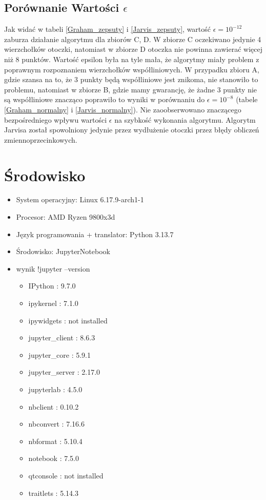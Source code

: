\documentclass[12pt, a4paper]{article}
\begin{document}
\subsection{Porównanie Wartości $\epsilon$} 
Jak widać w tabeli \ref{Graham_zepsuty} i \ref{Jarvis_zepsuty}, wartość $\epsilon=10^{-12}$
zaburza działanie algorytmu dla zbiorów C, D. W zbiorze C oczekiwano jedynie 4 wierzchołków otoczki, natomiast w zbiorze D otoczka nie
powinna zawierać więcej niż 8 punktów. Wartość epsilon była na tyle mała, że algorytmy miały problem z poprawnym rozpoznaniem wierzchołków
współliniowych. W przypadku zbioru A, gdzie szansa na to, że 3 punkty będą współliniowe jest znikoma, nie stanowiło to problemu,
natomiast w zbiorze B, gdzie mamy gwarancję, że żadne 3 punkty nie są współliniowe znacząco poprawiło to wyniki w porównaniu do
$\epsilon=10^{-8}$ (tabele \ref{Graham_normalny} i \ref{Jarvis_normalny}). Nie zaoobserwowano znaczącego bezpośredniego wpływu wartości
$\epsilon$ na szybkość wykonania algorytmu. Algorytm Jarvisa został spowolniony jedynie przez wydłużenie otoczki przez błędy obliczeń
zmiennoprzecinkowych.

\section{Środowisko}
\begin{itemize}
    \item System operacyjny: Linux 6.17.9-arch1-1
    \item Procesor: AMD Ryzen 9800x3d
    \item Język programowania + translator: Python 3.13.7
    \item Środowisko: JupyterNotebook
    \item wynik !jupyter --version
        \begin{itemize}
        \item IPython          : 9.7.0
        \item ipykernel        : 7.1.0
        \item ipywidgets       : not installed
        \item jupyter\_client   : 8.6.3
        \item jupyter\_core     : 5.9.1
        \item jupyter\_server   : 2.17.0
        \item jupyterlab       : 4.5.0
        \item nbclient         : 0.10.2
        \item nbconvert        : 7.16.6
        \item nbformat         : 5.10.4
        \item notebook         : 7.5.0
        \item qtconsole        : not installed
        \item traitlets        : 5.14.3
    \end{itemize}
\end{itemize}
\end{document}
